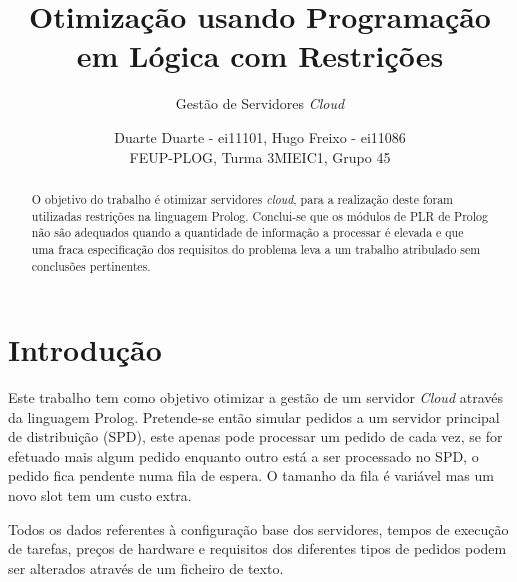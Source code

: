 \documentclass{llncs}
\begin{document}
\title{Otimização usando Programação em Lógica com Restrições}
\subtitle{Gestão de Servidores \textit{Cloud}}

\author{Duarte Duarte - ei11101, Hugo Freixo - ei11086 \\ FEUP-PLOG, Turma 3MIEIC1, Grupo 45}


\maketitle

\begin{abstract}

O objetivo do trabalho é otimizar servidores \textit{cloud}, para a realização deste foram utilizadas restrições na linguagem Prolog. Conclui-se que os módulos de PLR de Prolog não são adequados quando a quantidade de informação a processar é elevada e que uma fraca especificação dos requisitos do problema leva a um trabalho atribulado sem conclusões pertinentes.

\end{abstract}

\section{Introdução }\label{sec:Introduction}
Este trabalho tem como objetivo otimizar a gestão de um servidor \textit{Cloud} através da linguagem Prolog. Pretende-se então simular pedidos a um servidor principal de distribuição (SPD), este apenas pode processar um pedido de cada vez, se for efetuado mais algum pedido enquanto outro está a ser processado no SPD, o pedido fica pendente numa fila de espera. O tamanho da fila é variável mas um novo slot tem um custo extra.

Todos os dados referentes à configuração base dos servidores, tempos de execução de tarefas, preços de hardware e requisitos dos diferentes tipos de pedidos podem ser alterados através de um ficheiro de texto.
\end{document}
